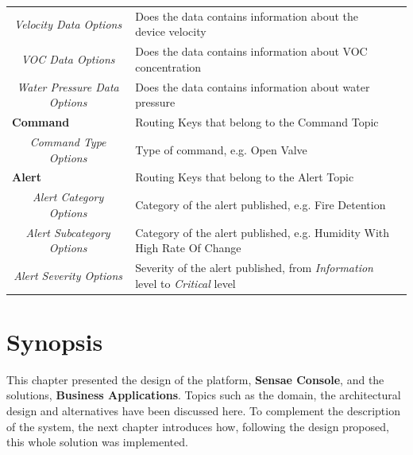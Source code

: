 \begin{landscape}
\begin{longtable}{cll}
   \textit{Velocity Data Options}          & Does the data contains information about the device velocity\footnotemark[1]\footnotemark[2]              &  \\
   \textit{VOC Data Options}               & Does the data contains information about VOC concentration\footnotemark[1]\footnotemark[2]                &  \\
   \textit{Water Pressure Data Options}    & Does the data contains information about water pressure\footnotemark[1]\footnotemark[2]                   &  \\ \cline{1-2}
   \multicolumn{1}{l}{\textbf{Command}}    & Routing Keys that belong to the Command Topic                                                             &  \\
   \textit{Command Type Options}           & Type of command, e.g. Open Valve                                                                          &  \\ \cline{1-2}
   \multicolumn{1}{l}{\textbf{Alert}}      & Routing Keys that belong to the Alert Topic                                                               &  \\
   \textit{Alert Category Options}         & Category of the alert published, e.g. Fire Detention                                                      &  \\
   \textit{Alert Subcategory Options}      & Category of the alert published, e.g. Humidity With High Rate Of Change                                   &  \\
   \textit{Alert Severity Options}         & Severity of the alert published, from \textit{Information} level to \textit{Critical} level               &  \\ \cline{1-2}
   \end{longtable}
\end{landscape}

\section{Synopsis}
\label{sec:design:synopsis}

This chapter presented the design of the platform, \textbf{Sensae Console}, and the solutions, \textbf{Business Applications}. Topics such as the domain, the architectural design and alternatives have been discussed here. To complement the description of the system, the next chapter introduces how, following the design proposed, this whole solution was implemented.
